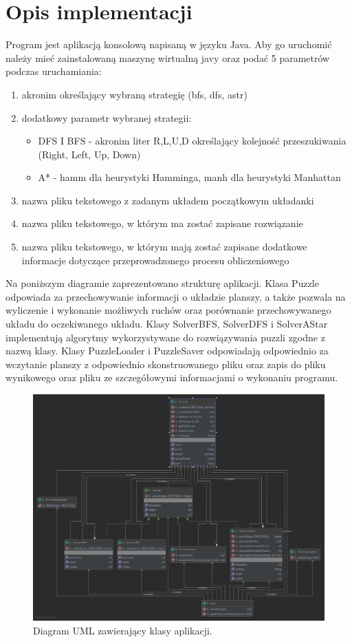 \documentclass{classrep}
\begin{document}
\section{Opis implementacji}
Program jest aplikacją konsolową napisaną w języku Java. Aby go uruchomić należy mieć zainstalowaną maszynę wirtualną javy oraz podać 5 parametrów podczas uruchamiania:
\begin{enumerate}
\item akronim określający wybraną strategię (bfs, dfs, astr)
\item dodatkowy parametr wybranej strategii:
\begin{itemize}
\item DFS I BFS - akronim liter R,L,U,D określający kolejność przeszukiwania (Right, Left, Up, Down)
\item A* - hamm dla heurystyki Hamminga, manh dla heurystyki Manhattan
\end{itemize}
\item nazwa pliku tekstowego z zadanym układem początkowym układanki
\item nazwa pliku tekstowego, w którym ma zostać zapisane rozwiązanie
\item nazwa pliku tekstowego, w którym mają zostać zapisane dodatkowe informacje dotyczące przeprowadzonego procesu obliczeniowego
\end{enumerate}
Na poniższym diagramie zaprezentowano strukturę aplikacji. Klasa Puzzle odpowiada za przechowywanie informacji o układzie planszy, a także pozwala na wyliczenie i wykonanie możliwych ruchów oraz porównanie przechowywanego układu do oczekiwanego układu. Klasy SolverBFS, SolverDFS i SolverAStar implementują algorytmy wykorzystywane do rozwiązywania puzzli zgodne z nazwą klasy. Klasy PuzzleLoader i PuzzleSaver odpowiadają odpowiednio za wczytanie planszy z odpowiednio skonstruowanego pliku oraz zapis do pliku wynikowego oraz pliku ze szczegółowymi informacjami o wykonaniu programu.
\newpage
\begin{figure}
\centering
\includegraphics [scale=0.2]{SISE_Zad1_UML}
\caption{Diagram UML zawierający klasy aplikacji.}
\end{figure}
\end{document}
